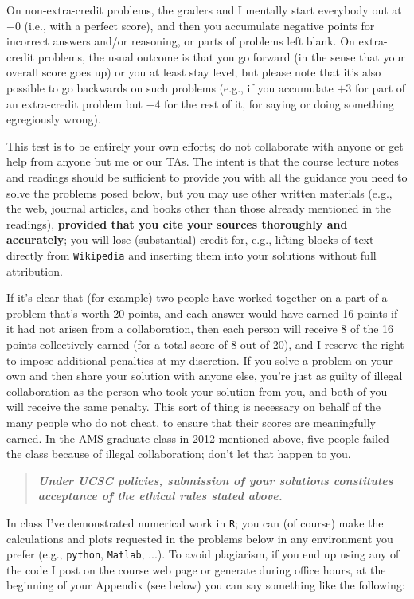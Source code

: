 \documentclass[12pt]{article}
\newcommand{\bi}[1]{\b{\i{#1}}}
\renewcommand{\b}[1]{\textbf{#1}}
\renewcommand{\i}[1]{\textit{#1}}
\renewcommand{\t}[1]{\texttt{#1}}
\begin{document}
On non-extra-credit problems, the graders and I mentally start everybody out at $-0$ (i.e., with a perfect score), and then you accumulate negative points for
incorrect answers and/or reasoning, or parts of problems left blank. On
extra-credit problems, the usual outcome is that you go forward (in the
sense that your overall score goes up) or you at least stay level, but
please note that it's also possible to go backwards on such problems (e.g.,
if you accumulate $+3$ for part of an extra-credit problem but $-4$ for the
rest of it, for saying or doing something egregiously wrong).

This test is to be entirely your own efforts; do not collaborate with
anyone or get help from anyone but me or our TAs. The intent is that the course lecture notes and readings should be sufficient to provide you with all the guidance you need to solve the problems posed below, but you may use other written materials (e.g., the web, journal articles, and books other than those already mentioned in the readings),
\textbf{provided that you cite your sources thoroughly and accurately}; you
will lose (substantial) credit for, e.g., lifting blocks of text directly
from \texttt{Wikipedia} and inserting them into your solutions without full
attribution.

If it's clear that (for example) two people have worked together on a part
of a problem that's worth 20 points, and each answer would have earned 16
points if it had not arisen from a collaboration, then each person will
receive 8 of the 16 points collectively earned (for a total score of 8 out
of 20), and I reserve the right to impose additional penalties at my
discretion. If you solve a problem on your own and then share your solution
with anyone else, you're just as guilty of illegal collaboration as
the person who took your solution from you, and both of you will receive
the same penalty. This sort of thing is necessary on behalf of the many
people who do not cheat, to ensure that their scores are meaningfully
earned. In the AMS graduate class in 2012 mentioned above, five people failed the class because of illegal collaboration; don't let that happen to you.

\begin{quote}

\bi{Under UCSC policies, submission of your solutions constitutes acceptance of the ethical rules stated above.}

\end{quote}

In class I've demonstrated numerical work in \texttt{R}; you can (of course) make the calculations and plots requested in the problems below in any environment you prefer (e.g., \t{python}, \texttt{Matlab}, ...). To avoid plagiarism, if you end up using any of the code I post on the course web page or generate during office hours, at the beginning of your Appendix (see below) you can say something like the following:
\end{document}
